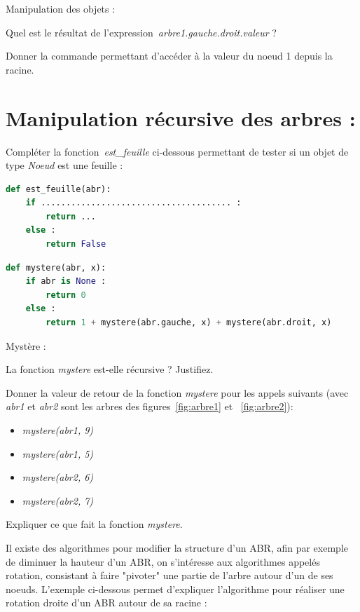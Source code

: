 \documentclass[a4paper, noanswers, addpoints, 12pt]{exam}
\begin{document}
\begin{questions}
\question[1] Manipulation des objets :
\begin{parts}
    \item Quel est le résultat de l'expression~\textit{arbre1.gauche.droit.valeur} ?
    \item Donner la commande permettant d'accéder à la valeur du noeud 1 depuis la racine.
\end{parts}

\section{Manipulation récursive des arbres : }

\question[1] Compléter la fonction~\textit{est\_feuille} ci-dessous permettant de tester si un objet de type  \textit{Noeud} est une feuille :
\begin{lstlisting}[style=mystyle, language=Python]
def est_feuille(abr):
    if ...................................... :
        return ...
    else :
        return False
\end{lstlisting}

\begin{lstlisting}[style=mystyle, language=Python]
def mystere(abr, x):
    if abr is None :
        return 0
    else :
        return 1 + mystere(abr.gauche, x) + mystere(abr.droit, x)
\end{lstlisting}
\newpage
\question[3] Mystère :
\begin{parts}
    \item La fonction \textit{mystere} est-elle récursive ? Justifiez.
    \item Donner la valeur de retour de la fonction \textit{mystere} pour les appels suivants (avec \textit{abr1} et \textit{abr2} sont les arbres des figures~\ref{fig:arbre1} et ~\ref{fig:arbre2}):
    \begin{itemize}
        \item \textit{ mystere(abr1, 9)}
        \item \textit{ mystere(abr1, 5)}
        \item \textit{ mystere(abr2, 6)}
        \item \textit{ mystere(abr2, 7)}
    \end{itemize}
    \item Expliquer ce que fait la fonction \textit{mystere}.
\end{parts}

Il existe des algorithmes pour modifier la structure d'un ABR, afin par exemple de diminuer la hauteur d'un ABR, on s'intéresse aux algorithmes appelés rotation, consistant à faire "pivoter" une partie de l'arbre autour d'un de ses noeuds.
L'exemple ci-dessous permet d'expliquer l'algorithme pour réaliser une rotation droite d'un ABR autour de sa racine :


\end{questions}
\end{document}
